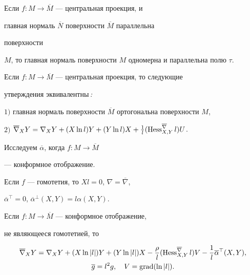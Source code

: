 \begin{cor}                   


Если $f: M \rightarrow \overline{M}$  --- центральная проекция, и 


главная нормаль $\overline{N}$ поверхности $\overline{M}$ параллельна


поверхности


$M$, то главная нормаль поверхности $M$ одномерна и параллельна полю $\tau$.


\end{cor}





\begin{thm}


Если $f: M \rightarrow \overline{M}$  --- центральная проекция, то следующие


утверждения эквивалентны\,{\em :}





$1)$ главная нормаль поверхности $\overline{M}$ ортогональна поверхности $M$,





$2)$ $\overline{\nabla}_{X}Y= \nabla_{X}Y+(X\ln l)Y+ (Y\ln l)X+


\frac{1}{l}(\Hess_{X,Y}^{\overline{\nabla}}l)U$.


\end{thm}  





Исследуем $\overline{\alpha}$, когда $f: M \rightarrow \overline{M}$


--- конформное отображение.


Если $f$ --- гомотетия, то $Xl=0$, $\nabla=\overline{\nabla}$,


$\overline{\alpha}^{\top}=0$, $\overline{\alpha}^{\bot}(X,Y)=l\alpha(X,Y).$                    


Если  $f: M \rightarrow \overline{M}$ --- конформное отображение, 


не являющееся гомотетией, то 


\begin{gather*}


\overline{\nabla}_{X}Y=\nabla_{X}Y+(X\ln|l|)Y+(Y\ln|l|)X-


\frac{\rho}{l}(\Hess_{X,Y}^{\overline{\nabla}} l)V-\frac{1}{l}


\overline{\alpha}^{\top}(X,Y), \\


%


\overline{g}=l^{2}g,\quad V=\grad(\ln|l|).


\end{gather*}



